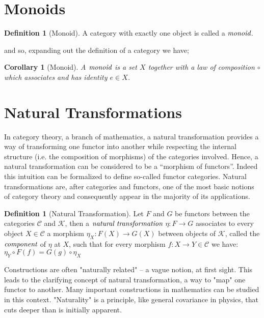 \documentclass[10pt, oneside, reqno]{amsart}
\theoremstyle{plain}%
\newtheorem*{cor}{Corollary}
\theoremstyle{definition}
\newtheorem{defn}[thm]{Definition}
\theoremstyle{remark}
\begin{document}
\section{Monoids} %
\label{sec:monoids}

\begin{defn}[Monoid]
A category with exactly one object is called a $\emph{monoid}$.
\end{defn}

and so, expanding out the definition of a category we have;
\begin{cor}[Monoid]
A $\emph{monoid}$ is a set $X$ together with a law of composition $\circ$
which associates and has identity $e \in X$.
\end{cor}


\section{Natural Transformations} %
\label{sec:natural transformations}
In category theory, a branch of mathematics, a natural transformation provides a way of transforming one functor into another
while respecting the internal structure (i.e. the composition of morphisms) of the categories involved.
Hence, a natural transformation can be considered to be a ``morphism of functors''.
Indeed this intuition can be formalized to define so-called functor categories.
Natural transformations are, after categories and functors, one of the most basic notions of category theory and consequently
appear in the majority of its applications.

\begin{defn}[Natural Transformation]
	Let $F$ and $G$ be functors between the categories $\mathcal{C}$ and $\mathcal{K}$, then a $\emph{natural transformation}$ $\eta : F \to G$
	associates to every object $X \in \mathcal{C}$ a morphism $\eta_{X} : F(X) \to G(X)$ between objects of $\mathcal{K}$, called the $\emph{component}$
	of $\eta$ at $X$, such that for every morphism $f : X \to Y \in \mathcal{C}$ we have:
	\\
	$\eta_{Y} \circ F(f) = G(g) \circ \eta_{X}$
\end{defn}
Constructions are often "naturally related" – a vague notion, at first sight.
This leads to the clarifying concept of natural transformation, a way to "map" one functor to another.
Many important constructions in mathematics can be studied in this context.
"Naturality" is a principle, like general covariance in physics, that cuts deeper than is initially apparent.
\end{document}
